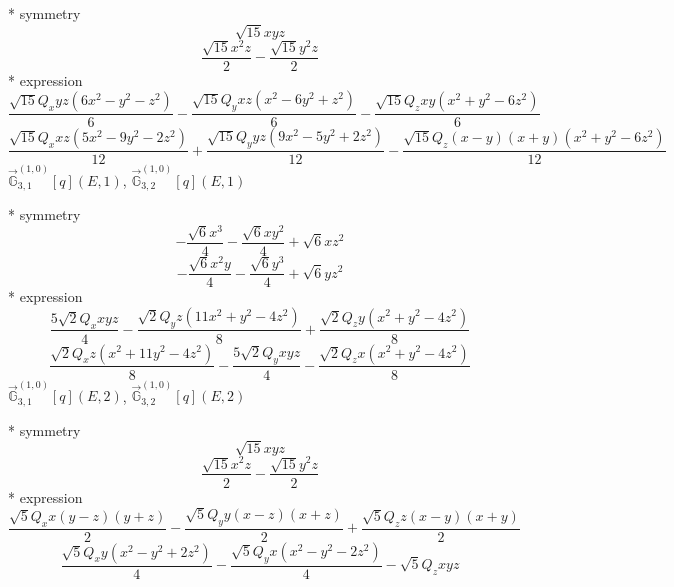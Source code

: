 \documentclass[fleqn,8pt]{jsarticle}
\begin{document}
\noindent\quad ** symmetry
\begin{dmath*}
\sqrt{15} x y z
\end{dmath*}
\begin{dmath*}
\frac{\sqrt{15} x^{2} z}{2} - \frac{\sqrt{15} y^{2} z}{2}
\end{dmath*}
\noindent\quad ** expression
\begin{dmath*}
\frac{\sqrt{15} Q_{x} y z \left(6 x^{2} - y^{2} - z^{2}\right)}{6} - \frac{\sqrt{15} Q_{y} x z \left(x^{2} - 6 y^{2} + z^{2}\right)}{6} - \frac{\sqrt{15} Q_{z} x y \left(x^{2} + y^{2} - 6 z^{2}\right)}{6}
\end{dmath*}
\begin{dmath*}
\frac{\sqrt{15} Q_{x} x z \left(5 x^{2} - 9 y^{2} - 2 z^{2}\right)}{12} + \frac{\sqrt{15} Q_{y} y z \left(9 x^{2} - 5 y^{2} + 2 z^{2}\right)}{12} - \frac{\sqrt{15} Q_{z} \left(x - y\right) \left(x + y\right) \left(x^{2} + y^{2} - 6 z^{2}\right)}{12}
\end{dmath*}
\noindent\quad $\vec{\mathbb{G}}_{3,1}^{(1,0)}[q](E,1)$, $\vec{\mathbb{G}}_{3,2}^{(1,0)}[q](E,1)$

\noindent\quad ** symmetry
\begin{dmath*}
- \frac{\sqrt{6} x^{3}}{4} - \frac{\sqrt{6} x y^{2}}{4} + \sqrt{6} x z^{2}
\end{dmath*}
\begin{dmath*}
- \frac{\sqrt{6} x^{2} y}{4} - \frac{\sqrt{6} y^{3}}{4} + \sqrt{6} y z^{2}
\end{dmath*}
\noindent\quad ** expression
\begin{dmath*}
\frac{5 \sqrt{2} Q_{x} x y z}{4} - \frac{\sqrt{2} Q_{y} z \left(11 x^{2} + y^{2} - 4 z^{2}\right)}{8} + \frac{\sqrt{2} Q_{z} y \left(x^{2} + y^{2} - 4 z^{2}\right)}{8}
\end{dmath*}
\begin{dmath*}
\frac{\sqrt{2} Q_{x} z \left(x^{2} + 11 y^{2} - 4 z^{2}\right)}{8} - \frac{5 \sqrt{2} Q_{y} x y z}{4} - \frac{\sqrt{2} Q_{z} x \left(x^{2} + y^{2} - 4 z^{2}\right)}{8}
\end{dmath*}
\noindent\quad $\vec{\mathbb{G}}_{3,1}^{(1,0)}[q](E,2)$, $\vec{\mathbb{G}}_{3,2}^{(1,0)}[q](E,2)$

\noindent\quad ** symmetry
\begin{dmath*}
\sqrt{15} x y z
\end{dmath*}
\begin{dmath*}
\frac{\sqrt{15} x^{2} z}{2} - \frac{\sqrt{15} y^{2} z}{2}
\end{dmath*}
\noindent\quad ** expression
\begin{dmath*}
\frac{\sqrt{5} Q_{x} x \left(y - z\right) \left(y + z\right)}{2} - \frac{\sqrt{5} Q_{y} y \left(x - z\right) \left(x + z\right)}{2} + \frac{\sqrt{5} Q_{z} z \left(x - y\right) \left(x + y\right)}{2}
\end{dmath*}
\begin{dmath*}
\frac{\sqrt{5} Q_{x} y \left(x^{2} - y^{2} + 2 z^{2}\right)}{4} - \frac{\sqrt{5} Q_{y} x \left(x^{2} - y^{2} - 2 z^{2}\right)}{4} - \sqrt{5} Q_{z} x y z
\end{dmath*}
\end{document}
